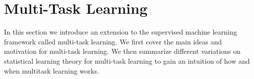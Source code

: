 \chapter{Multi-Task Learning}
\label{multi-task_learning}
In this section we introduce an extension to the supervised machine learning framework called multi-task learning. We first cover the main ideas and motivation for multi-task learning. We then summarize different variations on statistical learning theory for multi-task learning to gain an intuition of how and when multitask learning works.




